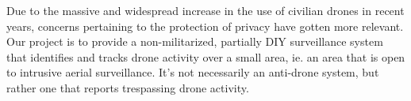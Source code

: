 Due to the massive and widespread increase in the use of civilian drones in recent years, concerns pertaining to the protection of privacy have gotten more relevant. Our project is to provide a non-militarized, partially DIY surveillance system that identifies and tracks drone activity over a small area, ie. an area that is open to intrusive aerial surveillance. It's not necessarily an anti-drone system, but rather one that reports trespassing drone activity.
